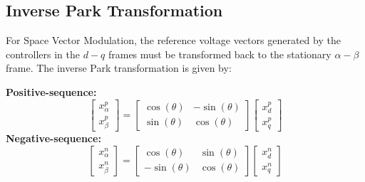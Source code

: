 \subsection{Inverse Park Transformation}
For Space Vector Modulation, the reference voltage vectors generated by the controllers in the $d-q$ frames
must be transformed back to the stationary $\alpha-\beta$ frame. The inverse Park transformation is given by:\par
\textbf{Positive-sequence:}
\begin{equation}
    \begin{bmatrix}
        x_{\alpha}^p \\
        x_{\beta}^p
    \end{bmatrix}
    =
    \begin{bmatrix}
        \cos(\theta) & -\sin(\theta) \\
        \sin(\theta) & \cos(\theta)
    \end{bmatrix}
    \begin{bmatrix}
        x_d^p \\
        x_q^p
    \end{bmatrix}
\end{equation}
\textbf{Negative-sequence:}
\begin{equation}
    \begin{bmatrix}
        x_{\alpha}^n \\
        x_{\beta}^n
    \end{bmatrix}
    =
    \begin{bmatrix}
        \cos(\theta)  & \sin(\theta) \\
        -\sin(\theta) & \cos(\theta)
    \end{bmatrix}
    \begin{bmatrix}
        x_d^n \\
        x_q^n
    \end{bmatrix}
\end{equation}